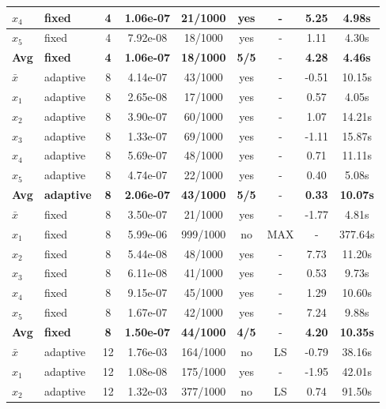 \begin{longtable}{|l|l|c|c|c|c|c|c|c|}
\hline
$x_4$ & fixed & 4 & 1.06e-07 & 21/1000 & yes & - & 5.25 & 4.98s \\
\hline
$x_5$ & fixed & 4 & 7.92e-08 & 18/1000 & yes & - & 1.11 & 4.30s \\
\hline
\hline\hline
\textbf{Avg} & \textbf{fixed} & \textbf{4} & \textbf{1.06e-07} & \textbf{18/1000} & \textbf{5/5} & - & \textbf{4.28} & \textbf{4.46s} \\
\hline\hline
$\bar{x}$ & adaptive & 8 & 4.14e-07 & 43/1000 & yes & - & -0.51 & 10.15s \\
\hline
$x_1$ & adaptive & 8 & 2.65e-08 & 17/1000 & yes & - & 0.57 & 4.05s \\
\hline
$x_2$ & adaptive & 8 & 3.90e-07 & 60/1000 & yes & - & 1.07 & 14.21s \\
\hline
$x_3$ & adaptive & 8 & 1.33e-07 & 69/1000 & yes & - & -1.11 & 15.87s \\
\hline
$x_4$ & adaptive & 8 & 5.69e-07 & 48/1000 & yes & - & 0.71 & 11.11s \\
\hline
$x_5$ & adaptive & 8 & 4.74e-07 & 22/1000 & yes & - & 0.40 & 5.08s \\
\hline
\hline\hline
\textbf{Avg} & \textbf{adaptive} & \textbf{8} & \textbf{2.06e-07} & \textbf{43/1000} & \textbf{5/5} & - & \textbf{0.33} & \textbf{10.07s} \\
\hline\hline
\hline
$\bar{x}$ & fixed & 8 & 3.50e-07 & 21/1000 & yes & - & -1.77 & 4.81s \\
\hline
$x_1$ & fixed & 8 & 5.99e-06 & 999/1000 & no & MAX & - & 377.64s \\
\hline
$x_2$ & fixed & 8 & 5.44e-08 & 48/1000 & yes & - & 7.73 & 11.20s \\
\hline
$x_3$ & fixed & 8 & 6.11e-08 & 41/1000 & yes & - & 0.53 & 9.73s \\
\hline
$x_4$ & fixed & 8 & 9.15e-07 & 45/1000 & yes & - & 1.29 & 10.60s \\
\hline
$x_5$ & fixed & 8 & 1.67e-07 & 42/1000 & yes & - & 7.24 & 9.88s \\
\hline
\hline\hline
\textbf{Avg} & \textbf{fixed} & \textbf{8} & \textbf{1.50e-07} & \textbf{44/1000} & \textbf{4/5} & - & \textbf{4.20} & \textbf{10.35s} \\
\hline\hline
$\bar{x}$ & adaptive & 12 & 1.76e-03 & 164/1000 & no & LS & -0.79 & 38.16s \\
\hline
$x_1$ & adaptive & 12 & 1.08e-08 & 175/1000 & yes & - & -1.95 & 42.01s \\
\hline
$x_2$ & adaptive & 12 & 1.32e-03 & 377/1000 & no & LS & 0.74 & 91.50s \\

\end{longtable}
